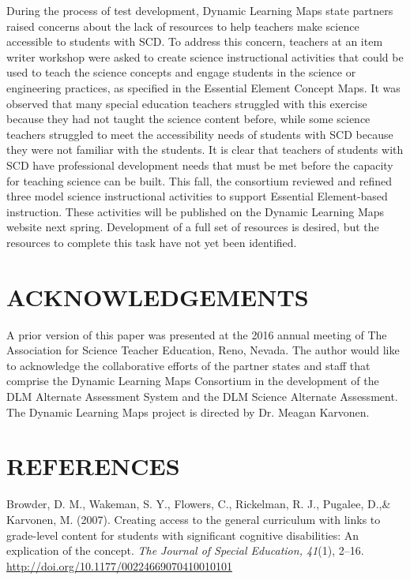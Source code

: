 \documentclass[11.5pt]{sig-alternate} %
\begin{document}
\begin{large}
During the process of test development, Dynamic Learning Maps state partners raised concerns about the lack of resources to help teachers make science accessible to students with SCD. To address this concern, teachers at an item writer workshop were asked to create science instructional activities that could be used to teach the science concepts and engage students in the science or engineering practices, as specified in the Essential Element Concept Maps. It was observed that many special education teachers struggled with this exercise because they had not taught the science content before, while some science teachers struggled to meet the accessibility needs of students with SCD because they were not familiar with the students. It is clear that teachers of students with SCD have professional development needs that must be met before the capacity for teaching science can be built. This fall, the consortium reviewed and refined three model science instructional activities to support Essential Element-based instruction. These activities will be published on the Dynamic Learning Maps website next spring. Development of a full set of resources is desired, but the resources to complete this task have not yet been identified. 

\section*{ACKNOWLEDGEMENTS}
A prior version of this paper was presented at the 2016 annual meeting of The Association for Science Teacher Education, Reno, Nevada. The author would like to acknowledge the collaborative efforts of the partner states and staff that comprise the Dynamic Learning Maps Consortium in the development of the DLM Alternate Assessment System and the DLM Science Alternate Assessment. The Dynamic Learning Maps project is directed by Dr. Meagan Karvonen.

\end{large}
\clearpage
\section*{REFERENCES}\par 

\leftskip 0.25in
\parindent -0.25in 
Browder, D. M., Wakeman, S. Y., Flowers, C., Rickelman, R. J., Pugalee, D.,\& Karvonen, M. (2007). Creating access to the general curriculum with links to grade-level content for students with significant cognitive disabilities: An explication of the concept. \textit{The Journal of Special Education, 41}(1), 2–16. \url{http://doi.org/10.1177/00224669070410010101}
\end{document}
